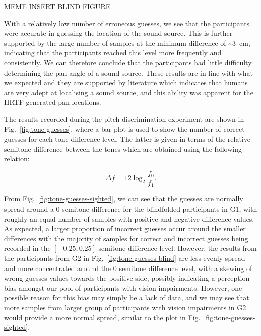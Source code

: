 \documentclass[sigconf, review=true, screen=true, anonymous=true]{acmart}
\begin{document}
MEME INSERT BLIND FIGURE

With a relatively low number of erroneous guesses, we see that the participants were accurate in guessing the location of the sound source.
This is further supported by the large number of samples at the minimum difference of \textasciitilde\SI{3}{\cm}, indicating that the participants reached this level more frequently and consistently. We can therefore conclude that the participants had little difficulty determining the pan angle of a sound source. These results are in line with what we expected and they are supported by literature which indicates that humans are very adept at localising a sound source, and this ability was apparent for the HRTF-generated pan locations. 

The results recorded during the pitch discrimination experiment are shown in Fig.~\ref{fig:tone-guesses}, where a bar plot is used to show the number of correct guesses for each tone difference level. The latter is given in terms of the relative semitone difference between the tones which are obtained using the following relation: 

\begin{equation}
\label{eq:semitone-difference}
  \Delta f = 12\log_2\frac{f_0}{f_1}.
\end{equation}

From Fig.~\ref{fig:tone-guesses-sighted}, we can see that the guesses are normally spread around a 0 semitone difference for the blindfolded participants in G1, with roughly an equal number of samples with positive and negative difference values.
As expected, a larger proportion of incorrect guesses occur around the smaller differences with the majority of samples for correct and incorrect guesses being recorded in the $[-0.25, 0.25]$ semitone difference level.
However, the results from the participants from G2 in Fig.~\ref{fig:tone-guesses-blind} are less evenly spread and more concentrated around the 0 semitone difference level, with a skewing of wrong guesses values towards the positive side, possibly indicating a perception bias amongst our pool of participants with vision impairments. However, one possible reason for this bias may simply be a lack of data, and we may see that more samples from larger group of participants with vision impairments in G2 would provide a more normal spread, similar to the plot in Fig.~\ref{fig:tone-guesses-sighted}.
\end{document}
